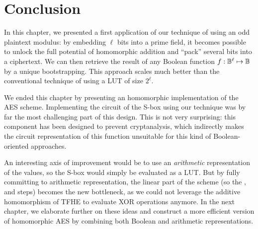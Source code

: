 \section{Conclusion}

In this chapter, we presented a first application of our technique of using an odd plaintext modulus: by embedding $\ell$ bits into a prime field, it becomes possible to unlock the full potential of homomorphic addition and ``pack'' several bits into a ciphertext. We can then retrieve the result of any Boolean function $f:\mathbb{B}^\ell \mapsto \mathbb{B}$ by a unique bootstrapping. This approach scales much better than the conventional technique of using a \gls{LUT} of size $2^\ell$.

We ended this chapter by presenting an homomorphic implementation of the \gls{AES} scheme. Implementing the circuit of the \gls{S-box} using our technique was by far the most challenging part of this design. This is not very surprising: this component has been designed to prevent cryptanalysis,  which indirectly makes the circuit representation of this function unsuitable for this kind of Boolean-oriented approaches.

An interesting axis of improvement would be to use an \textit{arithmetic} representation of the values, so the \gls{S-box} would simply be evaluated as a \gls{LUT}. But by fully committing to arithmetic representation, the linear part of the scheme (so the \ShiftRows, \MixColumns and \AddRoundKey steps) becomes the new bottleneck, as we could not leverage the additive homomorphism of \gls{TFHE} to evaluate XOR operations anymore. In the next chapter, we elaborate further on these ideas and construct a more efficient version of homomorphic \gls{AES} by combining both Boolean and arithmetic representations. 

